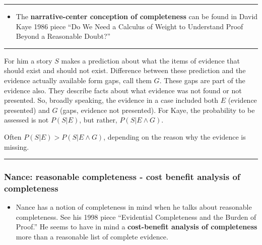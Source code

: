 \documentclass[
  10pt,
  dvipsnames,enabledeprecatedfontcommands]{scrartcl}
\providecommand{\tightlist}{%
  \setlength{\itemsep}{0pt}\setlength{\parskip}{0pt}}
\begin{document}
\begin{center}\rule{0.5\linewidth}{0.5pt}\end{center}

\begin{itemize}
\tightlist
\item
  The \textbf{narrative-center conception of completeness} can be found
  in David Kaye 1986 piece ``Do We Need a Calculus of Weight to
  Understand Proof Beyond a Reasonable Doubt?''
\end{itemize}

\begin{center}\rule{0.5\linewidth}{0.5pt}\end{center}

For him a story \(S\) makes a prediction about what the items of
evidence that should exist and should not exist. Difference between
these prediction and the evidence actually available form gaps, call
them \(G\). These gaps are part of the evidence also. They describe
facts about what evidence was not found or not presented. So, broadly
speaking, the evidence in a case included both \(E\) (evidence
presented) and \(G\) (gaps, evidence not presented). For Kaye, the
probability to be assessed is not \(P(S \vert E)\), but rather,
\(P(S \vert E \wedge G)\).

Often \(P(S \vert E) > P(S \vert E \wedge G)\), depending on the reason
why the evidence is missing.


\begin{center}\rule{0.5\linewidth}{0.5pt}\end{center}

\hypertarget{nance-reasonable-completeness---cost-benefit-analysis-of-completeness}{%
\subsubsection{Nance: reasonable completeness - cost benefit analysis of
completeness}\label{nance-reasonable-completeness---cost-benefit-analysis-of-completeness}}

\begin{itemize}
\tightlist
\item
  Nance has a notion of completeness in mind when he talks about
  reasonable completeness. See his 1998 piece ``Evidential Completeness
  and the Burden of Proof.'' He seems to have in mind a
  \textbf{cost-benefit analysis of completeness} more than a reasonable
  list of complete evidence.
\end{itemize}
\end{document}
